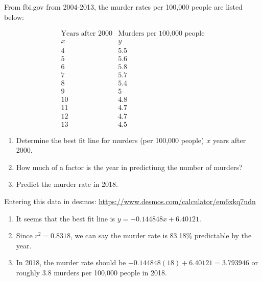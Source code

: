 \begin{example}
From fbi.gov from 2004-2013, the murder rates per 100,000 people are listed below:

$$\begin{array}{c|c}
\text{Years after 2000} & \text{Murders per 100,000 people}\\
x&y\\
\hline
4&5.5\\
5&5.6\\
6&5.8\\
7&5.7\\
8&5.4\\
9&5\\
10&4.8\\
11&4.7\\
12&4.7\\
13&4.5
\end{array}$$
\begin{enumerate}
\item Determine the best fit line for murders (per 100,000 people) $x$ years after 2000.
\item How much of a factor is the year in predictiung the number of murders?
\item Predict the murder rate in 2018.
\end{enumerate}

Entering this data in desmos: \url{https://www.desmos.com/calculator/em6xkq7udn}

\begin{enumerate}
\item It seems that the best fit line is $y=-0.144848x+6.40121$.
\item Since $r^2=0.8318$, we can say the murder rate is 83.18\% predictable by the year.
\item In 2018, the murder rate should be $-0.144848(18)+6.40121=3.793946$ or roughly 3.8 murders per 100,000 people in 2018.
\end{enumerate}




\end{example}



